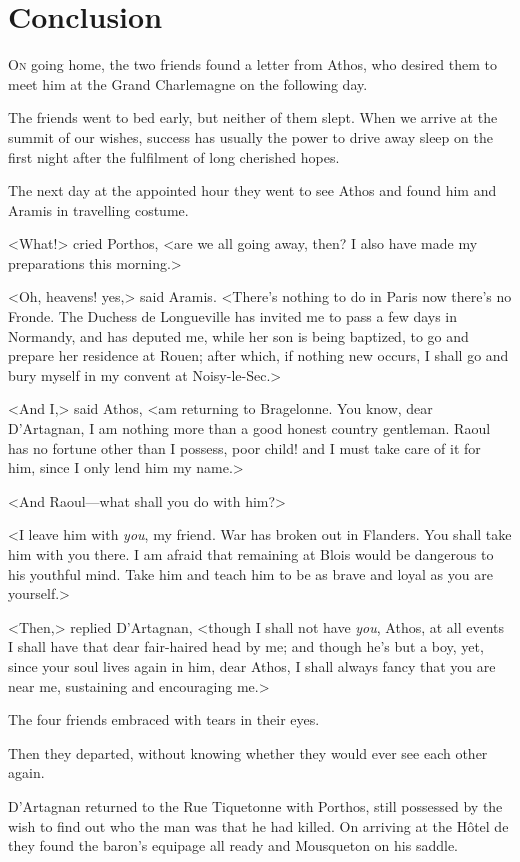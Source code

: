 \chapter{Conclusion}

 \lettrine{O}{n} going home, the two friends found a letter from Athos, who desired them to meet him at the Grand Charlemagne on the following day.

\zz
The friends went to bed early, but neither of them slept. When we arrive at the summit of our wishes, success has usually the power to drive away sleep on the first night after the fulfilment of long cherished hopes.

The next day at the appointed hour they went to see Athos and found him and Aramis in travelling costume.

<What!> cried Porthos, <are we all going away, then? I also have made my preparations this morning.>

<Oh, heavens! yes,> said Aramis. <There's nothing to do in Paris now there's no Fronde. The Duchess de Longueville has invited me to pass a few days in Normandy, and has deputed me, while her son is being baptized, to go and prepare her residence at Rouen; after which, if nothing new occurs, I shall go and bury myself in my convent at Noisy-le-Sec.>

<And I,> said Athos, <am returning to Bragelonne. You know, dear D'Artagnan, I am nothing more than a good honest country gentleman. Raoul has no fortune other than I possess, poor child! and I must take care of it for him, since I only lend him my name.>

<And Raoul—what shall you do with him?>

<I leave him with \emph{you}, my friend. War has broken out in Flanders. You shall take him with you there. I am afraid that remaining at Blois would be dangerous to his youthful mind. Take him and teach him to be as brave and loyal as you are yourself.>

<Then,> replied D'Artagnan, <though I shall not have \emph{you}, Athos, at all events I shall have that dear fair-haired head by me; and though he's but a boy, yet, since your soul lives again in him, dear Athos, I shall always fancy that you are near me, sustaining and encouraging me.>

The four friends embraced with tears in their eyes.

Then they departed, without knowing whether they would ever see each other again.

D'Artagnan returned to the Rue Tiquetonne with Porthos, still possessed by the wish to find out who the man was that he had killed. On arriving at the Hôtel de  they found the baron's equipage all ready and Mousqueton on his saddle.

